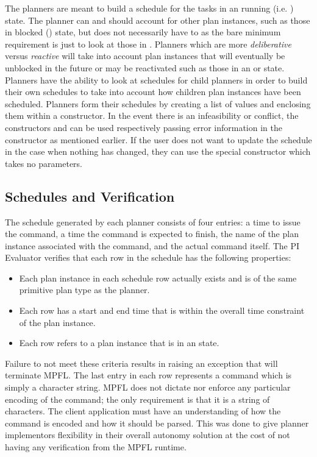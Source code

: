 The planners are meant to build a schedule for the tasks in an running (i.e. ) state. The planner can and should account for other plan instances, such as those in blocked () state, but does not necessarily have to as the bare minimum requirement is just to look at those in . Planners which are more \emph{deliberative} versus \emph{reactive} will take into account plan instances that will eventually be unblocked in the future or may be reactivated such as those in an  or  state. Planners have the ability to look at schedules for child planners in order to build their own schedules to take into account how children plan instances have been scheduled. Planners form their schedules by creating a list of  values and enclosing them within a  constructor. In the event there is an infeasibility or conflict, the constructors  and  can be used respectively passing error information in the constructor as mentioned earlier. If the user does not want to update the schedule in the case when nothing has changed, they can use the special  constructor which takes no parameters. 

\subsection{Schedules and Verification}
The schedule generated by each planner consists of four entries: a time to issue the command, a time the command is expected to finish, the name of the plan instance associated with the command, and the actual command itself. The PI Evaluator verifies that each row in the schedule has the following properties:
\begin{itemize}
\item Each plan instance in each schedule row actually exists and is of the same primitive plan type as the planner.
\item Each row has a start and end time that is within the overall time constraint of the plan instance.
\item Each row refers to a plan instance that is in an  state.
\end{itemize}

Failure to not meet these criteria results in raising an exception that will terminate MPFL. The last entry in each row represents a command which is simply a character string. MPFL does not dictate nor enforce any particular encoding of the command; the only requirement is that it is a string of characters. The client application must have an understanding of how the command is encoded and how it should be parsed. This was done to give planner implementors flexibility in their overall autonomy solution at the cost of not having any verification from the MPFL runtime.

